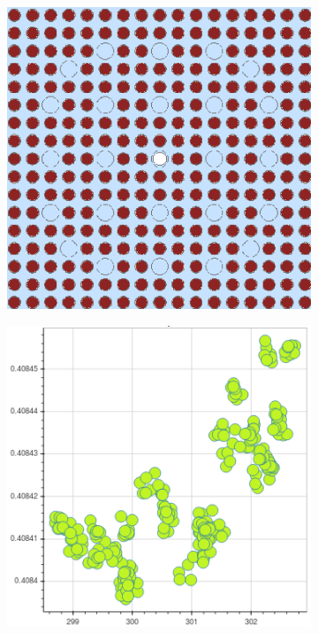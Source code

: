 \begin{figure}[h!]
\centering
\begin{subfigure}{0.42\textwidth}
  \centering
  \includegraphics[width=0.9\linewidth]{figures/unsupervised/features/assm-16/geometry}
  \caption{}
  \label{fig:chap10-fiss-mean-spect-ind-geom}
\end{subfigure}%
\begin{subfigure}{0.42\textwidth}
  \centering
  \includegraphics[width=0.9\linewidth]{figures/unsupervised/features/assm-16/u235-fiss/mean-spect-ind/mgxs}

\end{subfigure}
\end{figure}
